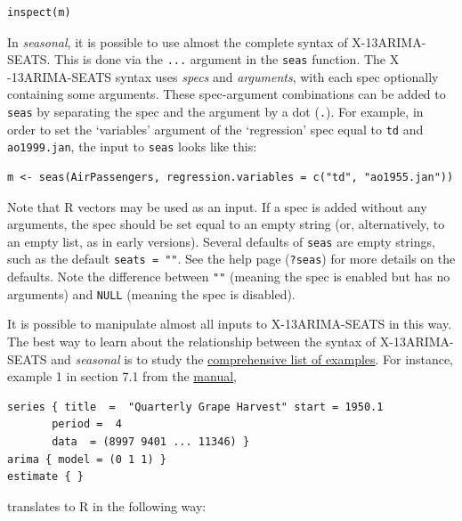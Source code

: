 \begin{verbatim}
inspect(m)
\end{verbatim}


In \emph{seasonal}, it is possible to use almost the complete syntax of
X-13ARIMA- SEATS. This is done via the \texttt{...} argument in the
\texttt{seas} function. The X -13ARIMA-SEATS syntax uses \emph{specs}
and \emph{arguments}, with each spec optionally containing some
arguments. These spec-argument combinations can be added to
\texttt{seas} by separating the spec and the argument by a dot
(\texttt{.}). For example, in order to set the `variables' argument of
the `regression' spec equal to \texttt{td} and \texttt{ao1999.jan}, the
input to \texttt{seas} looks like this:

\begin{verbatim}
m <- seas(AirPassengers, regression.variables = c("td", "ao1955.jan"))
\end{verbatim}

Note that R vectors may be used as an input. If a spec is added without
any arguments, the spec should be set equal to an empty string (or,
alternatively, to an empty list, as in early versions). Several defaults
of \texttt{seas} are empty strings, such as the default
\texttt{seats = ""}. See the help page (\texttt{?seas}) for more details
on the defaults. Note the difference between \texttt{""} (meaning the
spec is enabled but has no arguments) and \texttt{NULL} (meaning the
spec is disabled).

It is possible to manipulate almost all inputs to X-13ARIMA-SEATS in
this way. The best way to learn about the relationship between the
syntax of X-13ARIMA- SEATS and \emph{seasonal} is to study the
\href{http://www.seasonal.website/examples.html}{comprehensive list of
examples}. For instance, example 1 in section 7.1 from the
\href{http://www.census.gov/ts/x13as/docX13ASHTML.pdf}{manual},

\begin{verbatim}
series { title  =  "Quarterly Grape Harvest" start = 1950.1
       period =  4
       data  = (8997 9401 ... 11346) }
arima { model = (0 1 1) }
estimate { }
\end{verbatim}

translates to R in the following way:

